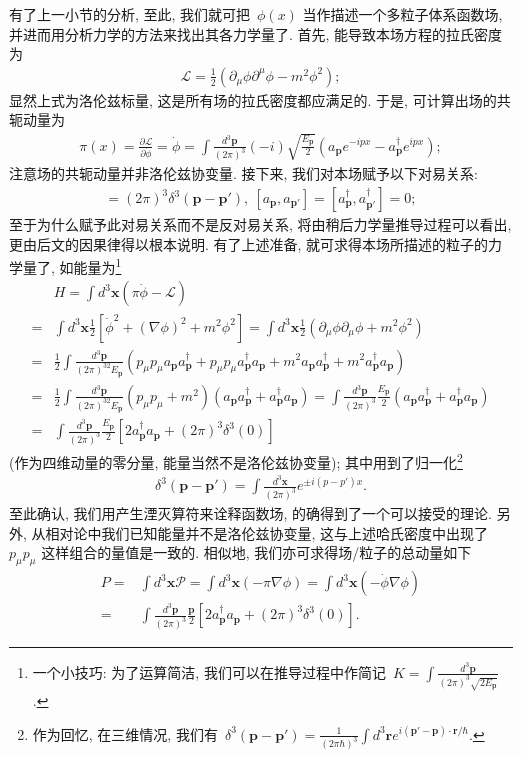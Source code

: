 有了上一小节的分析, 至此, 我们就可把~$\phi(x)$ 当作描述一个多粒子体系函数场, 并进而用分析力学的方法来找出其各力学量了. 首先, 能导致本场方程的拉氏密度为
\begin{align}
\mathcal{L}=\frac{1}{2}(\partial_\mu\phi\partial^\mu\phi-m^2\phi^2);
\end{align}
显然上式为洛伦兹标量, 这是所有场的拉氏密度都应满足的. 于是, 可计算出场的共轭动量为
\begin{align}
\pi(x)=\frac{\partial\mathcal{L}}{\partial\dot{\phi}}=\dot{\phi}=\int\frac{d^3\bm{p}}{(2\pi)^3}(-i)\sqrt{\frac{E_{\bm{p}}}{2}}\left(a_{\bm{p}}e^{-ipx}-a^\dag_{\bm{p}}e^{ipx}\right);
\end{align}
注意场的共轭动量并非洛伦兹协变量. 接下来, 我们对本场赋予以下对易关系:
\begin{align}
[a_{\bm{p}},a^\dag_{\bm{p}'}]=(2\pi)^3\delta^3(\bm{p}-\bm{p}'),~[a_{\bm{p}},a_{\bm{p}'}]=[a^\dag_{\bm{p}},a^\dag_{\bm{p}'}]=0;
\end{align}
至于为什么赋予此对易关系而不是反对易关系, 将由稍后力学量推导过程可以看出, 更由后文的因果律得以根本说明. 有了上述准备, 就可求得本场所描述的粒子的力学量了, 如能量为\footnote{一个小技巧: 为了运算简洁, 我们可以在推导过程中作简记~$K=\int \frac{d^3\bm{p}}{(2\pi)^3\sqrt{2E_{\bm{p}}}}$.}
\begin{align}
&H=\int d^3\bm{x}(\mathcal{\pi\dot{\phi}-\mathcal{L}})\nonumber\\
=&\int d^3\bm{x}\frac{1}{2}\left[\dot{\phi}^2+(\nabla\phi)^2+m^2\phi^2\right]=\int d^3\bm{x}\frac{1}{2}(\partial_\mu\phi\partial_\mu\phi+m^2\phi^2)\nonumber\\
=&\frac{1}{2}\int \frac{d^3\bm{p}}{(2\pi)^32E_{\bm{p}}}
\left(p_\mu p_\mu a_{\bm{p}}a^\dag_{\bm{p}}+p_\mu p_\mu a^\dag_{\bm{p}} a_{\bm{p}}+m^2 a_{\bm{p}}a^\dag_{\bm{p}}+m^2 a^\dag_{\bm{p}}a_{\bm{p}}\right)\nonumber\\
=&\frac{1}{2}\int \frac{d^3\bm{p}}{(2\pi)^32E_{\bm{p}}}(p_\mu p_\mu+m^2)(a_{\bm{p}}a^\dag_{\bm{p}}+a^\dag_{\bm{p}}a_{\bm{p}})=\int \frac{d^3\bm{p}}{(2\pi)^3}\frac{E_{\bm{p}}}{2}(a_{\bm{p}}a^\dag_{\bm{p}}+a^\dag_{\bm{p}}a_{\bm{p}})\nonumber\\
=&\int\frac{d^3\bm{p}}{(2\pi)^3}\frac{E_{\bm{p}}}{2}\left[2a^\dag_{\bm{p}}a_{\bm{p}}+(2\pi)^3\delta^3(0)\right]
\end{align}
(作为四维动量的零分量, 能量当然不是洛伦兹协变量); 其中用到了归一化\footnote{作为回忆, 在三维情况, 我们有~$\delta^3(\bm{p}-\bm{p}')=\frac{1}{(2\pi\hbar)^3}\int d^3\bm{r}e^{i(\bm{p}'-\bm{p})\cdot\bm{r}/\hbar}$.}
\begin{align}
\delta^3(\bm{p}-\bm{p}')=\int \frac{d^3\bm{x}}{(2\pi)^3}e^{\pm i(p-p')x}.
\end{align}
至此确认, 我们用产生湮灭算符来诠释函数场, 的确得到了一个可以接受的理论. 另外, 从相对论中我们已知能量并不是洛伦兹协变量, 这与上述哈氏密度中出现了~$p_\mu p_\mu$ 这样组合的量值是一致的. 相似地, 我们亦可求得场/粒子的总动量如下
\begin{align}
P=&\int d^3\bm{x}\mathcal{P}=\int d^3\bm{x} (-\pi\nabla\phi)=\int d^3\bm{x} (-\dot{\phi}\nabla\phi)\nonumber\\
=&\int\frac{d^3\bm{p}}{(2\pi)^3}\frac{\bm{p}}{2}\left[2a^\dag_{\bm{p}}a_{\bm{p}}+(2\pi)^3\delta^3(0)\right].
\end{align}

